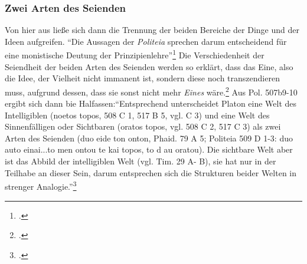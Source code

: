 \subsubsection{Zwei Arten des Seienden}
Von hier aus ließe sich dann die Trennung der beiden Bereiche der Dinge und der Ideen aufgreifen.
\enquote{Die Aussagen der \emph{Politeia} sprechen darum entscheidend für eine monistische Deutung der Prinzipienlehre}\footcite[][S. 137]{halfwassen2015spuren}
Die Verschiedenheit der Seiendheit der beiden Arten des Seienden werden so erklärt, dass das Eine, also die Idee, der Vielheit nicht immanent ist, sondern diese noch transzendieren muss, aufgrund dessen, dass sie sonst nicht mehr \emph{Eines} wäre.\footcite[vgl.][S. 246]{halfwassenaufstieg2006}
Aus Pol. 507b9-10 ergibt sich dann bie Halfassen:\enquote{Entsprechend unterscheidet Platon eine Welt des Intelligiblen (noetos topos, 508 C 1, 517 B 5, vgl. C 3) und eine Welt des Sinnenfälligen oder Sichtbaren (oratos topos, vgl. 508 C 2, 517 C 3) als zwei Arten des Seienden (duo eide ton onton, Phaid. 79 A 5; Politeia 509 D 1-3: duo auto einai...to men ontou te kai topos, to d au oratou). Die sichtbare Welt aber ist das Abbild der intelligiblen Welt (vgl. Tim. 29 A- B), sie hat nur in der Teilhabe an dieser Sein, darum entsprechen sich die Strukturen beider Welten in strenger Analogie.}\footcite[][S. 246]{halfwassenaufstieg2006}

